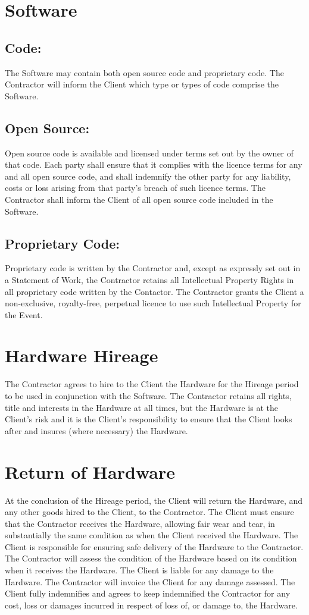 \documentclass[a4paper,12pt]{article}
\begin{document}
\section{Software}
\subsection{Code:}  The Software may contain both open source code and proprietary code.  The Contractor will inform the Client which type or types of code comprise the Software.
\subsection{Open Source:}  Open source code is available and licensed under terms set out by the owner of that code.  Each party shall ensure that it complies with the licence terms for any and all open source code, and shall indemnify the other party for any liability, costs or loss arising from that party’s breach of such licence terms.  The Contractor shall inform the Client of all open source code included in the Software.
\subsection{Proprietary Code:}  Proprietary code is written by the Contractor and, except as expressly set out in a Statement of Work, the Contractor retains all Intellectual Property Rights in all proprietary code written by the Contactor.  The Contractor grants the Client a non-exclusive, royalty-free, perpetual licence to use such Intellectual Property for the Event. 
\section{Hardware Hireage}
The Contractor agrees to hire to the Client the Hardware for the Hireage period to be used in conjunction with the Software.
The Contractor retains all rights, title and interests in the Hardware at all times, but the Hardware is at the Client’s risk and it is the Client’s responsibility to ensure that the Client looks after and insures (where necessary) the Hardware.
\section{Return of Hardware}
At the conclusion of the Hireage period, the Client will return the Hardware, and any other goods hired to the Client, to the Contractor.  The Client must ensure that the Contractor receives the Hardware, allowing fair wear and tear, in substantially the same condition as when the Client received the Hardware.
The Client is responsible for ensuring safe delivery of the Hardware to the Contractor.  The Contractor will assess the condition of the Hardware based on its condition when it receives the Hardware.
The Client is liable for any damage to the Hardware.  The Contractor will invoice the Client for any damage assessed.  The Client fully indemnifies and agrees to keep indemnified the Contractor for any cost, loss or damages incurred in respect of loss of, or damage to, the Hardware.
\end{document}
